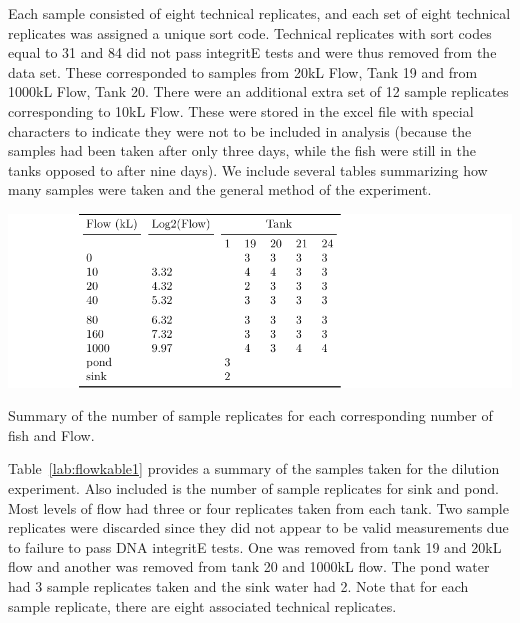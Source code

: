 \vspace{5mm}

Each sample consisted of eight technical replicates, and each set of eight technical replicates was assigned a unique sort code. Technical replicates with sort codes equal to 31 and 84 did not pass integritE tests and were thus removed from the data set. These corresponded to samples from 20kL Flow, Tank 19 and from 1000kL Flow, Tank 20. There were an additional extra set of 12 sample replicates corresponding to 10kL Flow. These were stored in the excel file with special characters to indicate they were not to be included in analysis (because the samples had been taken after only three days, while the fish were still in the tanks opposed to after nine days). We include several tables summarizing how many samples were taken and the general method of the experiment.


\begin{table}[H]
\includegraphics{Chapter4Images/flowkable1.pdf}
\caption{Summary of the number of sample replicates for each corresponding number of fish and Flow.}
\label{lab:flowkable1}
\end{table}

Table~\ref{lab:flowkable1} provides a summary of the samples taken for the dilution experiment. Also included is the number of sample replicates for sink and pond. Most levels of flow had three or four replicates taken from each tank. Two sample replicates were discarded since they did not appear to be valid measurements due to failure to pass DNA integritE tests. One was removed from tank 19 and 20kL flow and another was removed from tank 20 and 1000kL flow. The pond water had 3 sample replicates taken and the sink water had 2.
Note that for each sample replicate, there are eight associated technical replicates.



